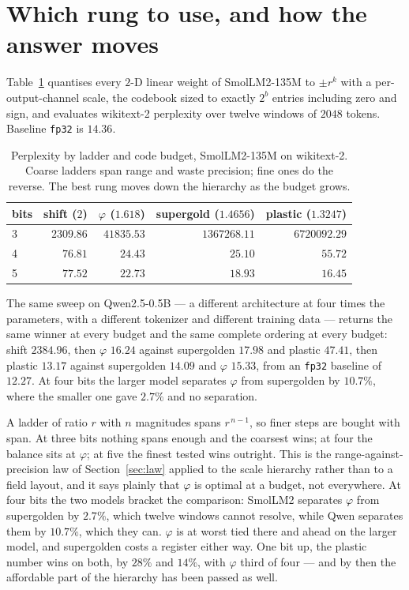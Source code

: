 \section{Which rung to use, and how the answer moves}\label{sec:ladderlaw}



Table~\ref{tab:ladderlaw} quantises every $2$-D linear weight of SmolLM2-135M to
$\pm r^{k}$ with a per-output-channel scale, the codebook sized to exactly
$2^{b}$ entries including zero and sign, and evaluates wikitext-2 perplexity
over twelve windows of $2048$ tokens. Baseline \texttt{fp32} is $14.36$.

\begin{table}[t]\centering
\caption{Perplexity by ladder and code budget, SmolLM2-135M on wikitext-2.
Coarse ladders span range and waste precision; fine ones do the reverse. The
best rung moves down the hierarchy as the budget grows.}
\label{tab:ladderlaw}
\begin{tabular}{lrrrr}
\toprule
bits & shift ($2$) & $\varphi$ ($1.618$) & supergold ($1.4656$) & plastic ($1.3247$) \\
\midrule
3 & $\mathbf{2309.86}$ & $41835.53$ & $1367268.11$ & $6720092.29$ \\
4 & $76.81$ & $\mathbf{24.43}$ & $25.10$ & $55.72$ \\
5 & $77.52$ & $22.73$ & $18.93$ & $\mathbf{16.45}$ \\
\bottomrule
\end{tabular}
\end{table}

The same sweep on Qwen2.5-0.5B --- a different architecture at four times the
parameters, with a different tokenizer and different training data --- returns
the same winner at every budget and the same complete ordering at every budget:
shift $2384.96$, then $\varphi$ $\mathbf{16.24}$ against supergolden $17.98$ and
plastic $47.41$, then plastic $\mathbf{13.17}$ against supergolden $14.09$ and
$\varphi$ $15.33$, from an \texttt{fp32} baseline of $12.27$. At four bits the
larger model separates $\varphi$ from supergolden by $10.7\%$, where the smaller
one gave $2.7\%$ and no separation.

A ladder of ratio $r$ with $n$ magnitudes spans $r^{\,n-1}$, so finer steps are
bought with span. At three bits nothing spans enough and the coarsest wins; at
four the balance sits at $\varphi$; at five the finest tested wins outright.
This is the range-against-precision law of Section~\ref{sec:law} applied to the
scale hierarchy rather than to a field layout, and it says plainly that
$\varphi$ is optimal at a budget, not everywhere. At four bits the two models bracket the comparison: SmolLM2 separates
$\varphi$ from supergolden by $2.7\%$, which twelve windows cannot resolve,
while Qwen separates them by $10.7\%$, which they can. $\varphi$ is at worst
tied there and ahead on the larger model, and supergolden costs a register
either way. One bit up, the plastic number wins on both, by $28\%$ and $14\%$,
with $\varphi$ third of four --- and by then the affordable part of the
hierarchy has been passed as well.

